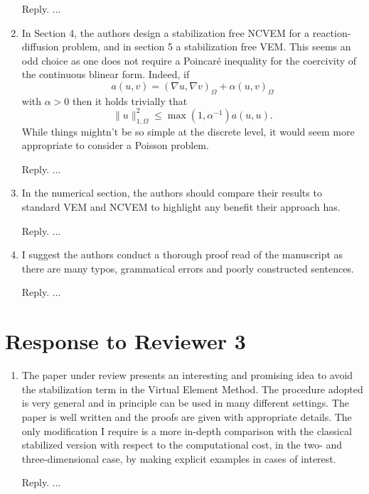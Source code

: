 \documentclass[10pt]{amsart}
\theoremstyle{definition}
\theoremstyle{remark}
\begin{document}
\begin{enumerate}[1.]
\smallskip \noindent \textcolor[rgb]{1.00,0.00,0.00}{Reply.}
...

\medskip

\item \textsf{In Section 4, the authors design a stabilization free NCVEM for a reaction-diffusion problem, and in section 5 a stabilization free VEM. This seems an odd choice as one does not require a Poincar\'e inequality for the coercivity of the continuous blinear form. Indeed, if
$$
a(u, v)=(\nabla u, \nabla v)_{\Omega}+\alpha (u, v)_{\Omega}
$$
with $\alpha > 0$ then it holds trivially that
$$
\|u\|_{1,\Omega}^2\leq\max(1,\alpha^{-1})a(u,u).
$$
While things mightn't be so simple at the discrete level, it would seem more
appropriate to consider a Poisson problem.}

\smallskip \noindent \textcolor[rgb]{1.00,0.00,0.00}{Reply.}
...

\medskip

\item \textsf{In the numerical section, the authors should compare their results to standard VEM and NCVEM to highlight any benefit their approach has.}

\smallskip \noindent \textcolor[rgb]{1.00,0.00,0.00}{Reply.}
...

\medskip

\item \textsf{I suggest the authors conduct a thorough proof read of the manuscript as there are many typos, grammatical errors and poorly constructed sentences.}

\smallskip \noindent \textcolor[rgb]{1.00,0.00,0.00}{Reply.}
...




\end{enumerate}


\section{Response to Reviewer 3}

\begin{enumerate}[1.]
\item \textsf{The paper under review presents an interesting and promising idea to avoid the stabilization term in the Virtual Element Method. The procedure adopted is very general and in principle can be used in many different settings. The paper is well written and the proofs are given with appropriate details. 
The only modification I require is a more in-depth comparison with the classical stabilized version with respect to the computational cost, in the two- and three-dimensional case, by making explicit examples in cases of interest.}

\smallskip \noindent \textcolor[rgb]{1.00,0.00,0.00}{Reply.}
...




\end{enumerate}





\end{document}

